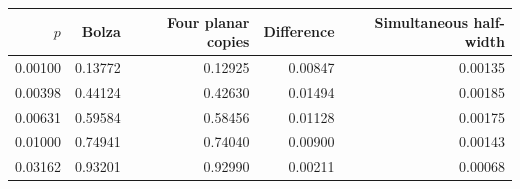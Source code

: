 \begin{tabular}{rrrrr}
\toprule $p$ & Bolza & Four planar copies & Difference & Simultaneous half-width\\\midrule
0.00100 & 0.13772 & 0.12925 & 0.00847 & 0.00135\\
0.00398 & 0.44124 & 0.42630 & 0.01494 & 0.00185\\
0.00631 & 0.59584 & 0.58456 & 0.01128 & 0.00175\\
0.01000 & 0.74941 & 0.74040 & 0.00900 & 0.00143\\
0.03162 & 0.93201 & 0.92990 & 0.00211 & 0.00068\\
\bottomrule\end{tabular}
